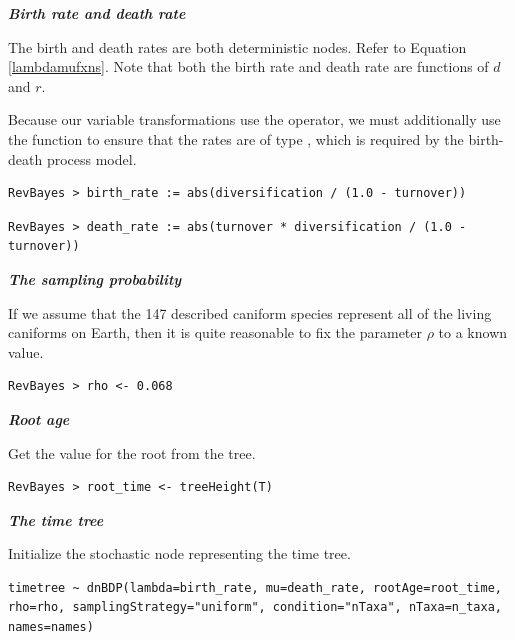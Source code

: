 \textbf{\textit{Birth rate and death rate}}

The birth and death rates are both deterministic nodes. 
Refer to Equation \ref{lambdamufxns}. Note that both the birth rate and death rate are functions of $d$ and $r$.

Because our variable transformations use the \cl{-} operator, we must additionally use the  function to ensure that the rates are of type , which is required by the birth-death process model.
{\tt \begin{snugshade*}
\begin{lstlisting}
RevBayes > birth_rate := abs(diversification / (1.0 - turnover))
\end{lstlisting}
\end{snugshade*}}

{\tt \begin{snugshade*}
\begin{lstlisting}
RevBayes > death_rate := abs(turnover * diversification / (1.0 - turnover))
\end{lstlisting}
\end{snugshade*}}

\textbf{\textit{The sampling probability}}

If we assume that the 147 described caniform species represent all of the living caniforms on Earth, then it is quite reasonable to fix the parameter $\rho$ to a known value.
{\tt \begin{snugshade*}
\begin{lstlisting}
RevBayes > rho <- 0.068
\end{lstlisting}
\end{snugshade*}}

\textbf{\textit{Root age}}

Get the value for the root from the \citet{dosReis2012} tree.

{\tt \begin{snugshade*}
\begin{lstlisting}
RevBayes > root_time <- treeHeight(T)
\end{lstlisting}
\end{snugshade*}}

\textbf{\textit{The time tree}}

Initialize the stochastic node representing the time tree.
{\tt \begin{snugshade*}
\begin{lstlisting}
timetree ~ dnBDP(lambda=birth_rate, mu=death_rate, rootAge=root_time, rho=rho, samplingStrategy="uniform", condition="nTaxa", nTaxa=n_taxa, names=names)
\end{lstlisting}
\end{snugshade*}}

